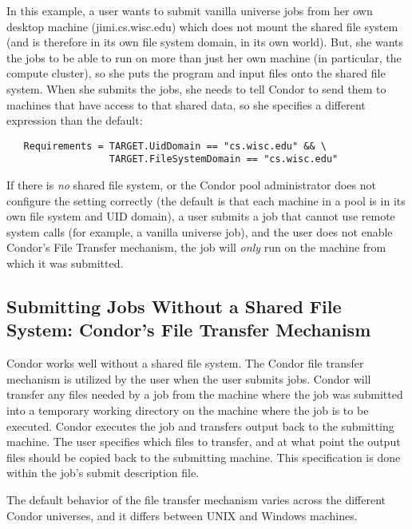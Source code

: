 In this example,
a user wants to submit vanilla universe jobs from her own desktop
machine (jimi.cs.wisc.edu) which does not mount the shared file system
(and is therefore in its own file system domain, in its own world).
But, she wants the jobs to be able to run on more than just her own
machine (in particular, the compute cluster), so she puts the program
and input files onto the shared file system.
When she submits the jobs, she needs to tell Condor to send them to
machines that have access to that shared data, so she specifies a
different  expression than the default:
\begin{verbatim}
   Requirements = TARGET.UidDomain == "cs.wisc.edu" && \
                  TARGET.FileSystemDomain == "cs.wisc.edu"
\end{verbatim}

\Warn If there is \emph{no} shared file system, or the Condor pool
administrator does not configure the \AdAttr{FileSystemDomain}
setting correctly (the default is that each machine in a pool is in
its own file system and UID domain), a user submits a job that cannot
use remote system calls (for example, a vanilla universe job), and the
user does not enable Condor's File Transfer mechanism, the job will
\emph{only} run on the machine from which it was submitted.


\subsection{\label{sec:file-transfer}
Submitting Jobs Without a Shared File System:
Condor's File Transfer Mechanism} 


Condor works well without a shared file system.
The Condor file transfer mechanism is utilized by the user
when the user submits jobs.
Condor will transfer any files needed by a job from
the machine where the job was submitted into a
temporary working directory on the machine where the
job is to be executed.
Condor executes the job
and transfers output back to the submitting machine.
The user specifies which files to transfer,
and at what point the output files should be copied back to the
submitting machine.
This specification is done within the job's submit description file.

The default behavior of the file transfer mechanism
varies across the
different Condor universes, and it differs between UNIX and Windows machines.

